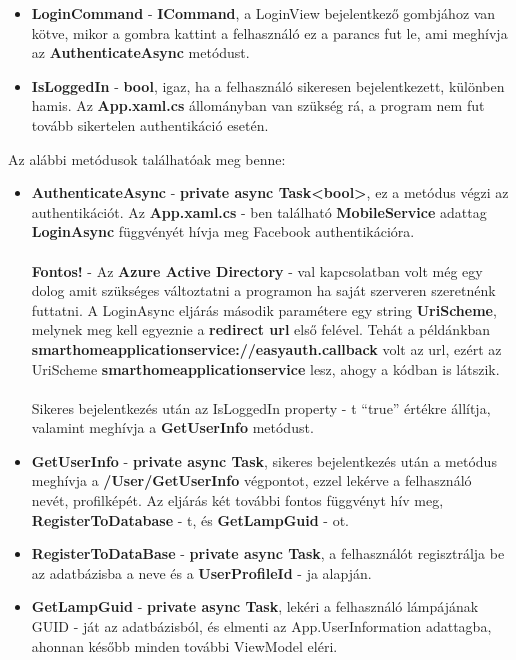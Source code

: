 \documentclass[a4paper,12pt]{report}
\begin{document}
\begin{itemize}
    \item \textbf{LoginCommand} - \textbf{ICommand}, a LoginView bejelentkező gombjához van kötve, mikor a gombra kattint a felhasználó
    ez a parancs fut le, ami meghívja az \textbf{AuthenticateAsync} metódust.
    \item \textbf{IsLoggedIn} - \textbf{bool}, igaz, ha a felhasználó sikeresen bejelentkezett, különben hamis. Az \textbf{App.xaml.cs}
    állományban van szükség rá, a program nem fut tovább sikertelen authentikáció esetén.
\end{itemize}

    Az alábbi metódusok találhatóak meg benne:

\begin{itemize}
    \item \textbf{AuthenticateAsync} - \textbf{private async Task<bool>}, ez a metódus végzi az authentikációt. Az \textbf{App.xaml.cs} - ben
    található \textbf{MobileService} adattag \textbf{LoginAsync} függvényét hívja meg Facebook authentikációra. \\
    \\\textbf{Fontos!} - Az \textbf{Azure Active Directory} - val kapcsolatban volt még egy dolog amit szükséges változtatni a programon ha saját
    szerveren szeretnénk futtatni. A LoginAsync eljárás második paramétere egy string \textbf{UriScheme}, melynek meg kell egyeznie
    a \textbf{redirect url} első felével. Tehát a példánkban \textbf{smarthomeapplicationservice://easyauth.callback} volt az url,
    ezért az UriScheme \textbf{smarthomeapplicationservice} lesz, ahogy a kódban is látszik.\\
    \\Sikeres bejelentkezés után az IsLoggedIn property - t ``true'' értékre állítja, valamint meghívja a \textbf{GetUserInfo} metódust.
    \item \textbf{GetUserInfo} - \textbf{private async Task}, sikeres bejelentkezés után a metódus meghívja a \textbf{/User/GetUserInfo} végpontot,
    ezzel lekérve a felhasználó nevét, profilképét. Az eljárás két további fontos függvényt hív meg, \textbf{RegisterToDatabase} - t, és \textbf{GetLampGuid} - ot.
    \item \textbf{RegisterToDataBase} - \textbf{private async Task}, a felhasználót regisztrálja be az adatbázisba a neve és a \textbf{UserProfileId} - ja alapján.
    \item \textbf{GetLampGuid} - \textbf{private async Task}, lekéri a felhasználó lámpájának GUID - ját az adatbázisból, és elmenti
    az App.UserInformation adattagba, ahonnan később minden további ViewModel eléri.
\end{itemize}
\end{document}
